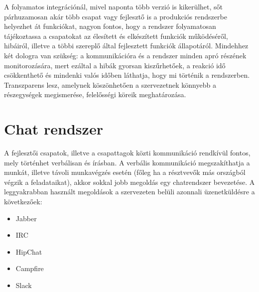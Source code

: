 A folyamatos integrációnál, mivel naponta több verzió is kikerülhet, sőt párhuzamosan akár több csapat vagy fejlesztő is a produkciós rendszerbe helyezhet át funkciókat, nagyon fontos, hogy a rendszer folyamatosan tájékoztassa a csapatokat az élesített és elkészített funkciók működéséről, hibáiról, illetve a többi szereplő által fejlesztett funkciók állapotáról. Mindehhez két dologra van szükség: a kommunikációra és a rendszer minden apró részének monitorozására, mert ezáltal a hibák gyorsan kiszűrhetőek, a reakció idő csökkenthető és mindenki valós időben láthatja, hogy mi történik a rendszerben. Transzparens lesz, amelynek köszönhetően a szervezetnek könnyebb a részegységek megismerése, felelősségi köreik meghatározása.

\section{Chat rendszer}
A fejlesztői csapatok, illetve a csapattagok közti kommunikáció rendkívül fontos, mely történhet verbálisan és írásban. A verbális kommunikáció megszakíthatja a munkát, illetve távoli munkavégzés esetén (főleg ha a résztvevők más országból végzik a feladataikat), akkor sokkal jobb megoldás egy chatrendszer bevezetése. A leggyakrabban használt megoldások a szervezeten belüli azonnali üzenetküldésre a következőek:
\begin{itemize}
	\item Jabber
	\item IRC
	\item HipChat
	\item Campfire
	\item Slack
\end{itemize}


